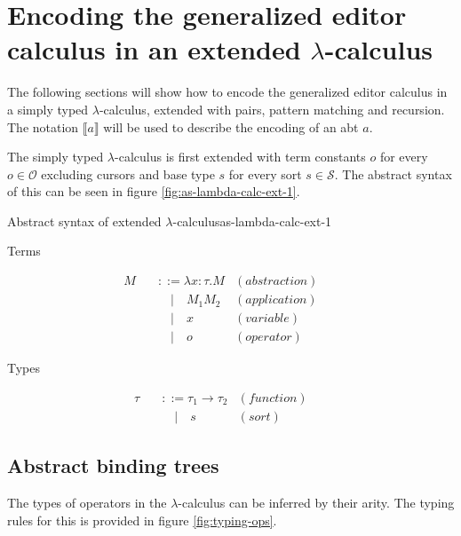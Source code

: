 \section{Encoding the generalized editor calculus in an extended $\lambda$-calculus}
The following sections will show how to encode the generalized editor calculus in a simply typed $\lambda$-calculus, extended with pairs, pattern matching and recursion. The notation $\llbracket a \rrbracket$ will be used to describe the encoding of an abt $a$.

The simply typed $\lambda$-calculus is first extended with term constants $o$ for every $o \in \mathcal{O}$ excluding cursors and base type $s$ for every sort $s \in \mathcal{S}$. The abstract syntax of this can be seen in figure \ref{fig:as-lambda-calc-ext-1}.

\begin{myfigure}{Abstract syntax of extended $\lambda$-calculus}{as-lambda-calc-ext-1}
    \begin{center}
        Terms
    \end{center}
    \[
        \begin{aligned}
            M \quad & ::= \lambda x : \tau.M & (abstraction) &  & \\
                    & \quad | \quad M_1 M_2  & (application) &  & \\
                    & \quad | \quad x        & (variable)    &  & \\
                    & \quad | \quad o        & (operator)
        \end{aligned}
    \]

    \begin{center}
        Types
    \end{center}
    \[
        \begin{aligned}
            \tau \quad & ::= \tau_1 \rightarrow \tau_2 & (function) &  & \\
                       & \quad | \quad s               & (sort)
        \end{aligned}
    \]
\end{myfigure}

\subsection{Abstract binding trees}

The types of operators in the $\lambda$-calculus can be inferred by their arity. The typing rules for this is provided in figure \ref{fig:typing-ops}.


